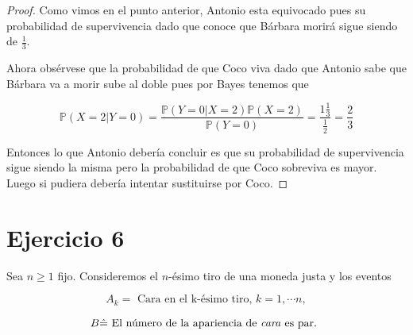 \documentclass[paper=letter, fontsize=11pt]{scrartcl} %
\numberwithin{equation}{section} %
\numberwithin{figure}{section} %
\numberwithin{table}{section} %
\newcommand{\prob}[1]{\mathbb{P}(#1)}
\begin{document}
\begin{enumerate}[label=\arabic*)]
\begin{proof}
Como vimos en el punto anterior, Antonio esta equivocado pues su probabilidad de supervivencia dado que conoce que Bárbara morirá sigue siendo de $ \frac{1}{3} $.

Ahora obsérvese que la probabilidad de que Coco viva dado que Antonio sabe que Bárbara va a morir sube al doble pues por Bayes tenemos que 

\begin{equation}
\prob{X=2|Y=0} = \frac{\prob{Y=0|X=2}\prob{X=2}}{\prob{Y=0}}= \frac{1\frac{1}{3}}{\frac{1}{2}}= \frac{2}{3} \nonumber
\end{equation}

Entonces lo que Antonio debería concluir es que su probabilidad de supervivencia sigue siendo la misma pero la probabilidad de que Coco sobreviva es mayor. Luego si pudiera debería intentar sustituirse por Coco.
\end{proof}
\end{enumerate}

\section{Ejercicio 6}

Sea $ n \geq 1 $ fijo. Consideremos el $ n $-ésimo tiro de una moneda justa y los eventos

\begin{equation}
A_k \hat{=} \text{ Cara en el k-ésimo tiro, } k = 1, \cdots n,  \nonumber
\end{equation}

\begin{equation}
B \hat{=} \text{ El número de la apariencia de \textit{cara} es par. } \nonumber
\end{equation}
\end{document}
